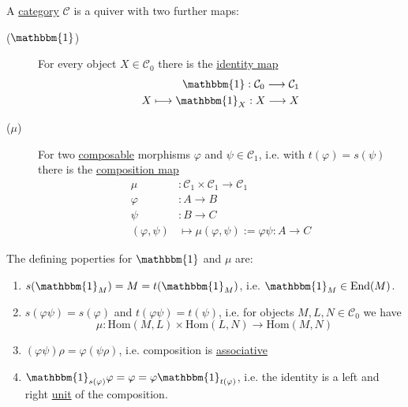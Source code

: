 \documentclass[12pt,compress]{beamer}
\begin{document}
\begin{frame}
A \ul{category} $\mathcal{C}$ is a quiver with two further maps:
\begin{description}
\item[($\mathbbm{1}$)] For every object $X \in \mathcal{C}_{0}$ there is the \ul{identity map} 
\begin{align*}
\mathbbm{1} : \mathcal{C}_{0} \longrightarrow \mathcal{C}_{1} \\
X \longmapsto \mathbbm{1}_{X} : X \longrightarrow X
\end{align*}
\item[($\mu$)] For two \ul{composable} morphisms $\varphi$ and $\psi \in \mathcal{C}_{1}$, i.e. with $t(\varphi) = s(\psi)$ there is
the \ul{composition map}
\begin{align*}
\mu &: \mathcal{C}_{1} \times \mathcal{C}_{1} \longrightarrow \mathcal{C}_{1} \\
\varphi &: A \longrightarrow B \\
\psi &: B \longrightarrow C \\
(\varphi, \psi) &\longmapsto \mu(\varphi, \psi) := \varphi\psi : A \longrightarrow C
\end{align*}
\end{description}
\end{frame}

\begin{frame}
The defining poperties for $\mathbbm{1}$ and $\mu$ are:
\begin{enumerate}
\item $s(\mathbbm{1}_{M}) = M = t(\mathbbm{1}_{M})$, i.e. $\mathbbm{1}_{M} \in \mathrm{End}(M)$.
\item $s(\varphi\psi) = s(\varphi)$ and $t(\varphi\psi) = t(\psi)$, i.e. for objects $M, L, N \in \mathcal{C}_{0}$ we have
\[
\mu : \mathrm{Hom}(M,L) \times \mathrm{Hom}(L,N) \longrightarrow \mathrm{Hom}(M,N)
\]
\item $(\varphi\psi)\rho = \varphi(\psi\rho)$, i.e. composition is \ul{associative}
\item $\mathbbm{1}_{s(\varphi)}\varphi = \varphi = \varphi\mathbbm{1}_{t(\varphi)}$, i.e. the identity is a left and right \ul{unit} of the composition.
\end{enumerate}
\end{frame}
\end{document}
